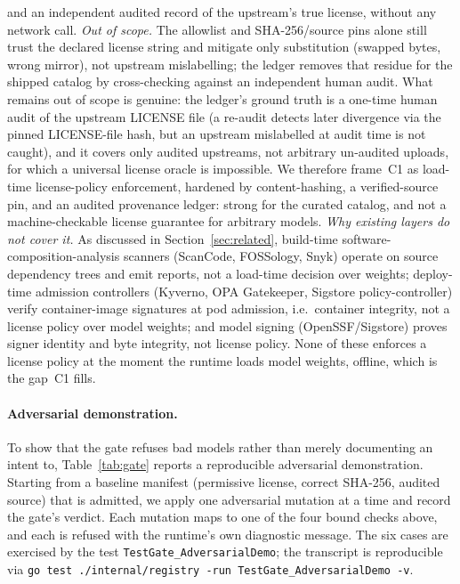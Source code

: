 and an independent audited record of the upstream's true license, without any network call.
\emph{Out of scope.}  The allowlist and SHA-256/source pins alone still trust the declared
license string and mitigate only substitution (swapped bytes, wrong mirror), not
upstream mislabelling; the ledger removes that residue for the shipped catalog by
cross-checking against an independent human audit.  What remains out of scope is genuine: the
ledger's ground truth is a one-time human audit of the upstream LICENSE file (a re-audit detects
later divergence via the pinned LICENSE-file hash, but an upstream mislabelled at audit
time is not caught), and it covers only audited upstreams, not arbitrary un-audited uploads, for
which a universal license oracle is impossible.  We therefore frame~C1 as load-time
license-policy enforcement, hardened by content-hashing, a verified-source pin, and an
audited provenance ledger: strong for the curated catalog, and not a
machine-checkable license guarantee for arbitrary models.
\emph{Why existing layers do not cover it.}  As discussed in
Section~\ref{sec:related}, build-time software-composition-analysis scanners
(ScanCode, FOSSology, Snyk) operate on source dependency trees and emit reports, not a
load-time decision over weights; deploy-time admission controllers (Kyverno, OPA
Gatekeeper, Sigstore policy-controller) verify container-image signatures at pod
admission, i.e.\ container integrity, not a license policy over model weights; and model
signing (OpenSSF/Sigstore) proves signer identity and byte integrity, not license policy.
None of these enforces a license policy at the moment the runtime loads model weights,
offline, which is the gap~C1 fills.

\paragraph{Adversarial demonstration.}
To show that the gate refuses bad models rather than merely documenting an
intent to, Table~\ref{tab:gate} reports a reproducible adversarial demonstration.
Starting from a baseline manifest (permissive license, correct SHA-256, audited source)
that is admitted, we apply one adversarial mutation at a time and record the gate's
verdict.  Each mutation maps to one of the four bound checks above, and each is refused
with the runtime's own diagnostic message.  The six cases are exercised by the test
\texttt{TestGate\_AdversarialDemo}; the transcript is reproducible via
\texttt{go test ./internal/registry -run TestGate\_AdversarialDemo -v}.

